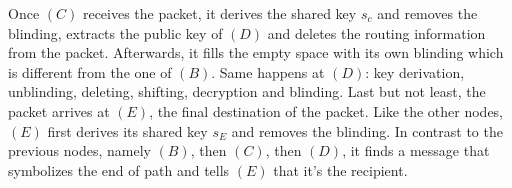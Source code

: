 \newline Once $(C)$ receives the packet, it derives the shared key $s_c$ and removes the blinding, extracts the public key of $(D)$ and deletes the routing information from the packet. Afterwards, it fills the empty space with its own blinding which is different from the one of $(B)$. 
\newline Same happens at $(D)$: key derivation, unblinding, deleting, shifting, decryption and blinding.
\newline Last but not least, the packet arrives at $(E)$, the final destination of the packet. Like the other nodes, $(E)$ first derives its shared key $s_E$ and removes the blinding. In contrast to the previous nodes, namely $(B)$, then $(C)$, then $(D)$, it finds a message that symbolizes the end of path and tells $(E)$ that it’s the recipient.









